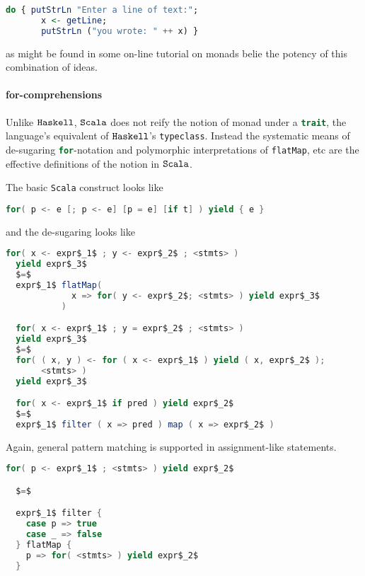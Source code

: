 \begin{lstlisting}[language=Haskell]
  do { putStrLn "Enter a line of text:";
       x <- getLine;
       putStrLn ("you wrote: " ++ x) }
\end{lstlisting}

as might be found in some on-line tutorial on monads belie the potency
of this combination of ideas.

\paragraph{for-comprehensions}
Unlike $\texttt{Haskell}$, $\texttt{Scala}$ does not reify the notion of monad under a
\lstinline[language=Scala]!trait!, the language's equivalent of
$\texttt{Haskell}$'s \lstinline[language=Haskell]!typeclass!. Instead the
systematic means of de-sugaring
\lstinline[language=Scala]!for!-notation and polymorphic
interpretations of \lstinline[language=Scala]!flatMap!, etc are the
effective definitions of the notion in $\texttt{Scala}$.

The basic \texttt{Scala} construct looks like

\begin{lstlisting}[language=Scala]
  for( p <- e [; p <- e] [p = e] [if t] ) yield { e }
\end{lstlisting}

and the de-sugaring looks like

\break
\begin{lstlisting}[language=Scala,mathescape=true,frame=single,caption={for-comprehension de-sugaring},captionpos=b]
  for( x <- expr$_1$ ; y <- expr$_2$ ; <stmts> )
  yield expr$_3$
  $=$
  expr$_1$ flatMap(
             x => for( y <- expr$_2$; <stmts> ) yield expr$_3$
           )

  for( x <- expr$_1$ ; y = expr$_2$ ; <stmts> ) 
  yield expr$_3$
  $=$
  for( ( x, y ) <- for ( x <- expr$_1$ ) yield ( x, expr$_2$ );
       <stmts> )
  yield expr$_3$

  for( x <- expr$_1$ if pred ) yield expr$_2$ 
  $=$
  expr$_1$ filter ( x => pred ) map ( x => expr$_2$ )    
\end{lstlisting}

Again, general pattern matching is supported in assignment-like statements.

\begin{lstlisting}[language=Scala,mathescape=true]
  for( p <- expr$_1$ ; <stmts> ) yield expr$_2$ 

  $=$

  expr$_1$ filter {
    case p => true
    case _ => false
  } flatMap {
    p => for( <stmts> ) yield expr$_2$
  }
\end{lstlisting}


